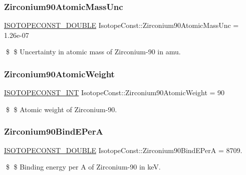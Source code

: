 \subsubsection{\texorpdfstring{Zirconium90\+Atomic\+Mass\+Unc}{Zirconium90AtomicMassUnc}}
{\footnotesize\ttfamily \mbox{\hyperlink{group___isotope_const-_macros_ga8f45a7272ce02c0b4c65c44636ed719a}{I\+S\+O\+T\+O\+P\+E\+C\+O\+N\+S\+T\+\_\+\+D\+O\+U\+B\+LE}} Isotope\+Const\+::\+Zirconium90\+Atomic\+Mass\+Unc = 1.\+26e-\/07}

\$ \$ Uncertainty in atomic mass of Zirconium-\/90 in amu. \mbox{\label{group___isotope_const-_zirconium-_zr90_ga437ac7f091424c694d20becf5ed8f339}} 
\subsubsection{\texorpdfstring{Zirconium90\+Atomic\+Weight}{Zirconium90AtomicWeight}}
{\footnotesize\ttfamily \mbox{\hyperlink{group___isotope_const-_macros_ga5f18360b3e99483a35c32d789e62621c}{I\+S\+O\+T\+O\+P\+E\+C\+O\+N\+S\+T\+\_\+\+I\+NT}} Isotope\+Const\+::\+Zirconium90\+Atomic\+Weight = 90}

\$ \$ Atomic weight of Zirconium-\/90. \mbox{\label{group___isotope_const-_zirconium-_zr90_gaa903045489cd921b1485cc81eb5e314e}} 
\subsubsection{\texorpdfstring{Zirconium90\+Bind\+E\+PerA}{Zirconium90BindEPerA}}
{\footnotesize\ttfamily \mbox{\hyperlink{group___isotope_const-_macros_ga8f45a7272ce02c0b4c65c44636ed719a}{I\+S\+O\+T\+O\+P\+E\+C\+O\+N\+S\+T\+\_\+\+D\+O\+U\+B\+LE}} Isotope\+Const\+::\+Zirconium90\+Bind\+E\+PerA = 8709.}

\$ \$ Binding energy per A of Zirconium-\/90 in keV. \mbox{\label{group___isotope_const-_zirconium-_zr90_gafa83608bcee99a28fd9c68d073f6e497}} 
